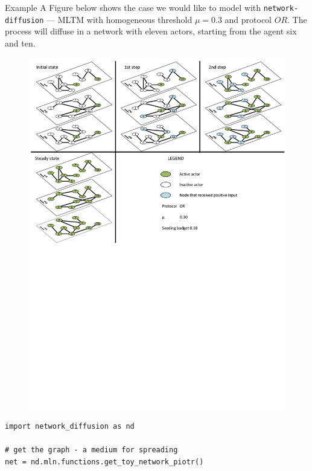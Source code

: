 \documentclass[final]{beamer}
\newlength{\colwidth}
\begin{document}
\begin{frame}[t, fragile]
\begin{columns}[t]
\begin{column}{\colwidth}
\begin{exampleblock}{Example}
A Figure below shows the case we would like to model with \lstinline[style=py]{network-diffusion} 
--- MLTM with homogeneous threshold $\mu=0.3$ and protocol $OR$. The process will diffuse in a
network with eleven actors, starting from the agent six and ten.
\begin{figure}
    \centering
    \includegraphics[width=1\linewidth]{../presentation/figures/ltm_example_or.pdf}
\end{figure}


\begin{lstlisting}[style=py, basicstyle=\footnotesize\ttfamily]
import network_diffusion as nd

# get the graph - a medium for spreading
net = nd.mln.functions.get_toy_network_piotr()


\end{lstlisting}
\end{exampleblock}
\end{column}
\end{columns}
\end{frame}
\end{document}
